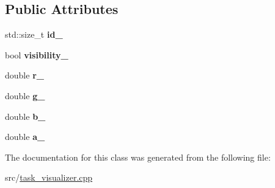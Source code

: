 \subsection*{Public Attributes}
\begin{DoxyCompactItemize}
\item 
\hypertarget{classhiqp_1_1TaskVisualPrimitive_ad09a580c9d583a967dda582ceb36a958}{std\-::size\-\_\-t {\bfseries id\-\_\-}}\label{classhiqp_1_1TaskVisualPrimitive_ad09a580c9d583a967dda582ceb36a958}

\item 
\hypertarget{classhiqp_1_1TaskVisualPrimitive_ad7baded10fdad47d75c698f3c05ab5b2}{bool {\bfseries visibility\-\_\-}}\label{classhiqp_1_1TaskVisualPrimitive_ad7baded10fdad47d75c698f3c05ab5b2}

\item 
\hypertarget{classhiqp_1_1TaskVisualPrimitive_a5f9284b44a3a43cdd0e47a8189a24f0a}{double {\bfseries r\-\_\-}}\label{classhiqp_1_1TaskVisualPrimitive_a5f9284b44a3a43cdd0e47a8189a24f0a}

\item 
\hypertarget{classhiqp_1_1TaskVisualPrimitive_ac9082c0da3c745d2119055484b2cfe67}{double {\bfseries g\-\_\-}}\label{classhiqp_1_1TaskVisualPrimitive_ac9082c0da3c745d2119055484b2cfe67}

\item 
\hypertarget{classhiqp_1_1TaskVisualPrimitive_a2b71e3c8badd67704a7fbc8806b52981}{double {\bfseries b\-\_\-}}\label{classhiqp_1_1TaskVisualPrimitive_a2b71e3c8badd67704a7fbc8806b52981}

\item 
\hypertarget{classhiqp_1_1TaskVisualPrimitive_a78f4dee39ba4c787e4fc9b7889435f5b}{double {\bfseries a\-\_\-}}\label{classhiqp_1_1TaskVisualPrimitive_a78f4dee39ba4c787e4fc9b7889435f5b}

\end{DoxyCompactItemize}


The documentation for this class was generated from the following file\-:\begin{DoxyCompactItemize}
\item 
src/\hyperlink{task__visualizer_8cpp}{task\-\_\-visualizer.\-cpp}\end{DoxyCompactItemize}
